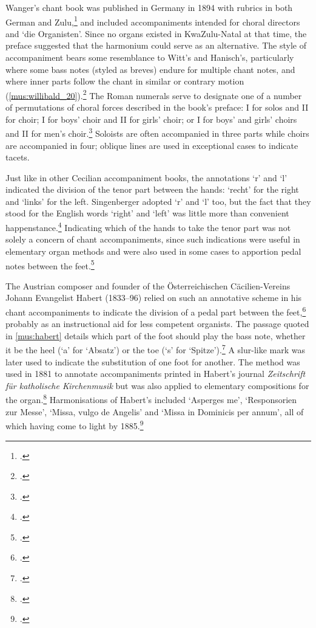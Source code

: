 \label{sc:wanger}%
Wanger's chant book was published in Germany in 1894 with rubrics in both German and Zulu,\footcite[34 and \emph{passim}]{WangerInncwadiYamagamaOkuhlabelela1894} and included accompaniments intended for choral directors and `die Organisten'.
Since no organs existed in KwaZulu-Natal at that time, the preface suggested that the harmonium could serve as an alternative.
The style of accompaniment bears some resemblance to Witt's and Hanisch's, particularly where some bass notes (styled as breves) endure for multiple chant notes, and where inner parts follow the chant in similar or contrary motion (\cref{mus:willibald_20}).\footcite[unpaginated `Vorrede' and p.~20]{WangerOrganumcomitansad1894}
The Roman numerals serve to designate one of a number of permutations of choral forces described in the book's preface: I for solos and II for choir; I for boys' choir and II for girls' choir; or I for boys' and girls' choirs and II for men's choir.\footcite[p.~vii]{WangerInncwadiYamagamaOkuhlabelela1894}
Soloists are often accompanied in three parts while choirs are accompanied in four; oblique lines are used in exceptional cases to indicate tacets.

%
Just like in other Cecilian accompaniment books, the annotations `r' and `l' indicated the division of the tenor part between the hands: `recht' for the right and `links' for the left.
Singenberger adopted `r' and `l' too, but the fact that they stood for the English words `right' and `left' was little more than convenient happenstance.\footcite[unpaginated preface]{SingenbergerOrganAccompanimentCantate1912}
Indicating which of the hands to take the tenor part was not solely a concern of chant accompaniments, since such indications were useful in elementary organ methods and were also used in some cases to apportion pedal notes between the feet.\footcite[See, for instance, Quadflieg's contributions in][78--83]{Diebold100groessereund1896}
\nowidow[2]

The Austrian composer and founder of the Österreichischen  Cäcilien-Vereins Johann Evangelist Habert (1833--96) relied on such an annotative scheme in his chant accompaniments to indicate the division of a pedal part between the feet,\footcite[56]{HornbachnerOrgelbewegungundOrgellehre2013} probably as an instructional aid for less competent organists.
The passage quoted in \cref{mus:habert} details which part of the foot should play the bass note, whether it be the heel (`a' for `Absatz') or the toe (`s' for `Spitze').\footcite[16]{SchmetzHarmonisierunggregorianischenChoralgesanges1894}
A slur-like mark was later used to indicate the substitution of one foot for another.
The method was used in 1881 to annotate accompaniments printed in Habert's journal \emph{Zeitschrift für katholische Kirchenmusik} but was also applied to elementary compositions for the organ.\footcite[2]{HabertOrgelcompositionen1877}
Harmonisations of Habert's included `Asperges me', `Responsorien zur Messe', `Missa, vulgo de Angelis' and `Missa in Dominicis per annum', all of which having come to light by 1885.\footcite[469--70]{E.KirchlicheCompositionenJohannes1885}

